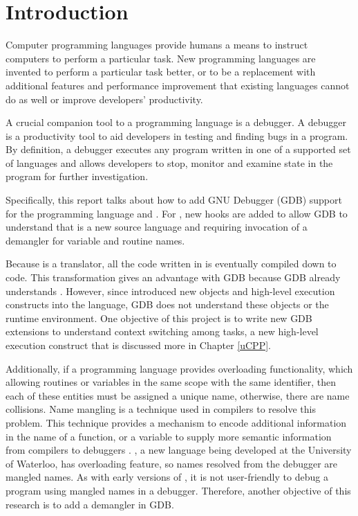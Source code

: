\chapter{Introduction} \label{introduction}
Computer programming languages provide humans a means to instruct computers to
perform a particular task. New programming languages are
invented to perform a particular task better, or to be a replacement with
additional features and performance improvement that existing languages cannot do as well or
improve developers' productivity.

A crucial companion tool to a programming language is a debugger. A debugger is a productivity tool to aid developers in testing
and finding bugs in a program. By definition, a debugger executes
any program written in one of a supported set of languages and allows developers
to stop, monitor and examine state in the program for further investigation.

Specifically, this report talks about how to add GNU Debugger (GDB) support for the
programming language \uCPPS and \CFA.
For \CFA, new hooks are added to allow GDB to understand that
\CFAS is a new source language and requiring invocation of a demangler for
variable and routine names.

Because \uCPPS is a translator, all the code written in \uCPPS is eventually
compiled down to \CCS code. This transformation gives \uCPPS an advantage with
GDB because GDB already understands \CC. However, since \uCPPS introduced new objects
and high-level execution constructs into the language, GDB does not understand
these objects or the runtime environment. One objective of this
project is to write new GDB extensions to understand context switching
among tasks, a new high-level execution construct that is discussed more in Chapter \ref{uCPP}.

Additionally, if a programming language provides overloading functionality,
which allowing routines or variables in the same scope with the
same identifier, then each of these entities must be assigned a unique name, otherwise,
there are name collisions.
Name mangling is a technique used in compilers to resolve this
problem. This technique provides a mechanism to encode additional information in the
name of a function, or a variable to supply more semantic information from
compilers to debuggers \cite{reference9}. \CFA, a new language being developed at the University of
Waterloo, has overloading feature, so names resolved from
the debugger are mangled names. As with early versions of \CC, it is not user-friendly to debug a program using
mangled names in
a debugger. Therefore, another objective of this research is to add a \CFAS demangler in GDB.
